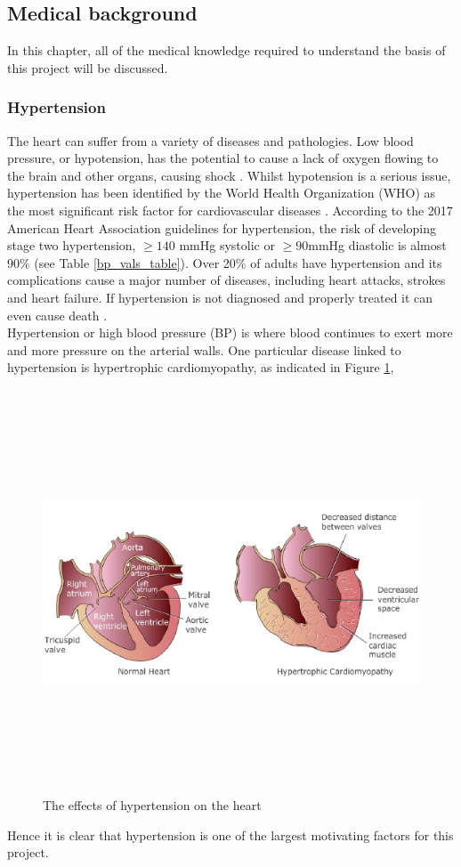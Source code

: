 \subsection{Medical background}
In this chapter, all of the medical knowledge required to 
understand the basis of this project will be discussed.
\subsubsection{Hypertension}
The heart can suffer from a variety of diseases and pathologies. Low blood 
pressure, or hypotension, has the potential to cause  a lack of oxygen 
flowing to the  brain  and  other  organs, causing shock \cite{Tanveer2018}. 
Whilst hypotension is a serious issue, hypertension has been identified by 
the World Health Organization (WHO) as the most significant risk factor for 
cardiovascular diseases \cite{Wang2018}. According to the 2017 American Heart 
Association guidelines for hypertension, the risk of developing stage two 
hypertension, $\ge 140$ mmHg systolic or $\ge 90$mmHg diastolic is almost 
90\% \cite{Bard2019} (see Table \ref{bp_vals_table}). Over 20\% of adults have 
hypertension  and  its  complications  cause  a  major  number  of  
diseases, including heart attacks, strokes and heart failure. If 
hypertension is not diagnosed and properly treated it can even cause 
death \cite{Janjua2017}.\\ \newline \noindent  Hypertension or high blood pressure (BP) is where blood continues to exert more and more pressure on the arterial walls. One particular disease linked to hypertension is hypertrophic cardiomyopathy, as indicated in Figure \ref{hypertension}, \begin{figure}[H]
    \centering
    \includegraphics[width=12cm,height=12cm,keepaspectratio]{Background/hypertension.jpeg}
    \caption{The effects of hypertension on the heart \cite{hypertrophic}}
    \label{hypertension}
\end{figure} \noindent Hence it is clear that hypertension is one of the largest motivating factors for this project.

